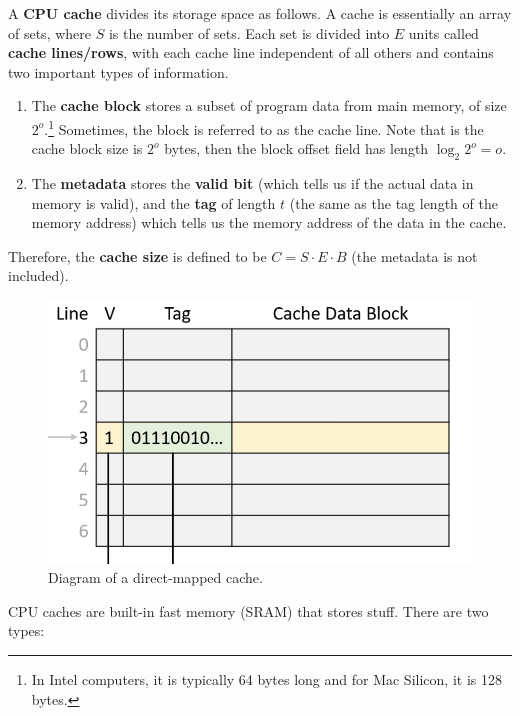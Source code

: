 \documentclass{article}
\begin{document}
      \begin{definition}
        A \textbf{CPU cache} divides its storage space as follows. A cache is essentially an array of sets, where $S$ is the number of sets. Each set is divided into $E$ units called \textbf{cache lines/rows}, with each cache line independent of all others and contains two important types of information. 
        \begin{enumerate}
          \item The \textbf{cache block} stores a subset of program data from main memory, of size $2^o$.\footnote{In Intel computers, it is typically 64 bytes long and for Mac Silicon, it is 128 bytes.} Sometimes, the block is referred to as the cache line. Note that is the cache block size is $2^o$ bytes, then the block offset field has length $\log_2 2^o = o$.
          \item The \textbf{metadata} stores the \textbf{valid bit} (which tells us if the actual data in memory is valid), and the \textbf{tag} of length $t$ (the same as the tag length of the memory address) which tells us the memory address of the data in the cache. 
        \end{enumerate}
        Therefore, the \textbf{cache size} is defined to be $C = S \cdot E \cdot B$ (the metadata is not included). 
        \begin{figure}[H]
          \centering 
          \includegraphics[scale=0.4]{img/direct_mapped_cache.png}
          \caption{Diagram of a direct-mapped cache.} 
          \label{fig:direct_mapped_cache}
        \end{figure}
        CPU caches are built-in fast memory (SRAM) that stores stuff. There are two types: 
        \begin{enumerate}

\end{enumerate}
\end{definition}
\end{document}
